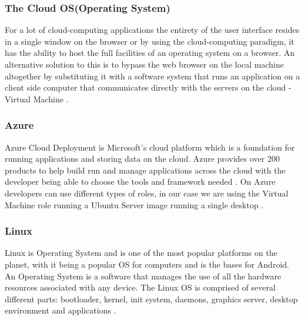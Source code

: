 \subsubsection{The Cloud OS(Operating System)}
For a lot of cloud-computing applications the entirety of the user interface resides in a single window on the browser or by using the cloud-computing paradigm, it has the ability to host the full facilities of an operating system on a browser.  An alternative solution to this is to bypass the web browser on the local machine altogether by substituting it with a software system that runs an application on a client side computer that communicates directly with the servers on the cloud - Virtual Machine \cite{hayes2008cloud}.


\subsubsection{Azure}
Azure Cloud Deployment is Microsoft's cloud platform which is a foundation for running applications and storing data on the cloud.  Azure provides over 200 products to help build run and manage applications across the cloud with the developer being able to choose the tools and framework needed \cite{azure}.  On Azure developers can use different types of roles, in our case we are using the Virtual Machine role running a Ubuntu Server image running a single desktop \cite{chappell2009introducing}.

\subsubsection{Linux}
Linux is Operating System and is one of the most popular platforms on the planet, with it being a popular OS for computers and is the bases for Android.  An Operating System is a software that manages the use of all the hardware resources associated with any device.  The Linux OS is comprised of several different parts: bootloader, kernel, init system, daemons, graphics server, desktop environment and applications \cite{linux}.

